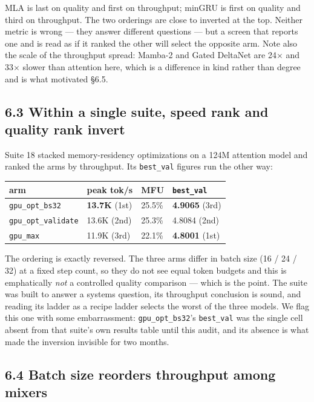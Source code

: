 MLA is last on quality and first on throughput; minGRU is first on quality and third on
throughput. The two orderings are close to inverted at the top. Neither metric is wrong --- they
answer different questions --- but a screen that reports one and is read as if it ranked the other
will select the opposite arm. Note also the scale of the throughput spread: Mamba-2 and Gated
DeltaNet are 24$\times$ and 33$\times$ slower than attention here, which is a difference in kind rather than
degree and is what motivated \S6.5.

\subsection{6.3 Within a single suite, speed rank and quality rank invert}\label{within-a-single-suite-speed-rank-and-quality-rank-invert}

Suite 18 stacked memory-residency optimizations on a 124M attention model and ranked the arms by
throughput. Its \texttt{best\_val} figures run the other way:

{%
{\small\begin{longtable}[]{@{}llll@{}}
\toprule\noalign{}
arm & peak tok/s & MFU & \texttt{best\_val} \\
\midrule\noalign{}
\endhead
\bottomrule\noalign{}
\endlastfoot
\texttt{gpu\_opt\_bs32} & \textbf{13.7K} (1st) & 25.5\% & \textbf{4.9065} (3rd) \\
\texttt{gpu\_opt\_validate} & 13.6K (2nd) & 25.3\% & 4.8084 (2nd) \\
\texttt{gpu\_max} & 11.9K (3rd) & 22.1\% & \textbf{4.8001} (1st) \\
\end{longtable}}
}

The ordering is exactly reversed. The three arms differ in batch size (16 / 24 / 32) at a fixed
step count, so they do not see equal token budgets and this is emphatically \emph{not} a controlled
quality comparison --- which is the point. The suite was built to answer a systems question, its
throughput conclusion is sound, and reading its ladder as a recipe ladder selects the worst of the
three models. We flag this one with some embarrassment: \texttt{gpu\_opt\_bs32}'s \texttt{best\_val} was the single
cell absent from that suite's own results table until this audit, and its absence is what made the
inversion invisible for two months.

\subsection{6.4 Batch size reorders throughput among mixers}\label{batch-size-reorders-throughput-among-mixers}

